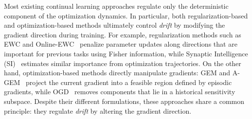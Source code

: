 \documentclass{article}
\begin{document}

Most existing continual learning approaches regulate only the deterministic component of the optimization dynamics. In particular, both regularization-based and optimization-based methods ultimately control \emph{drift} by modifying the gradient direction during training. For example, regularization methods such as EWC and Online-EWC~\cite{EWC2017,onlineEWC} penalize parameter updates along directions that are important for previous tasks using Fisher information, while Synaptic Intelligence (SI)~\cite{SI2017} estimates similar importance from optimization trajectories. On the other hand, optimization-based methods directly manipulate gradients: GEM and A-GEM~\cite{lopez-pazGradientEpisodicMemory2017,chaudhry2019efficientlifelonglearningagem} project the current gradient into a feasible region defined by episodic gradients, while OGD~\cite{farajtabarOrthogonalGradientDescent2020} removes components that lie in a historical sensitivity subspace. Despite their different formulations, these approaches share a common principle: they regulate \emph{drift} by altering the gradient direction.
\end{document}
